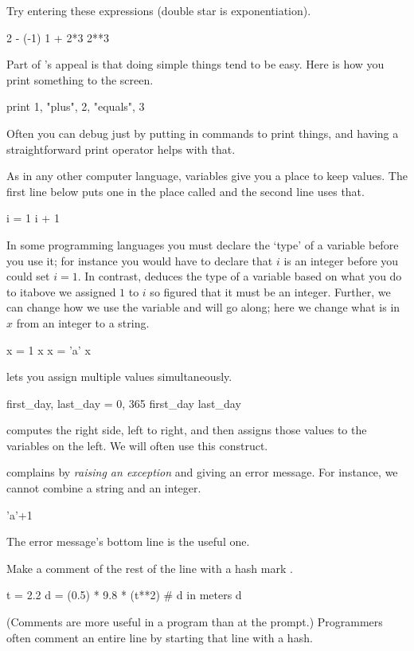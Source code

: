 Try entering these expressions (double star is exponentiation).
\begin{pythonoutput}
2 - (-1)
1 + 2*3
2**3  
\end{pythonoutput}

Part of \python's appeal is that doing simple things tend to be easy.
Here is how you print something to the screen.
\begin{pythonoutput}
print 1, "plus", 2, "equals", 3
\end{pythonoutput}
Often you can debug just by putting in commands to print things, 
and having a straightforward print operator helps with that. 

As in any other computer language, variables give you a place to keep values.
The first line below puts one in the place called 
and the second line uses that.
\begin{pythonoutput}
i = 1
i + 1
\end{pythonoutput}
In some programming languages you must declare the `type' of a variable
before you use it; for instance you would have to declare 
that $i$ is an integer before you could set $i=1$.
In contrast, \python{} deduces the type of a variable 
based on what you do to it\Dash above we assigned $1$ to $i$ 
so \python{} figured that it must be an integer.
Further, we can change how we use the variable and \python{} will 
go along; here we change what is in $x$ from an integer to a string.
\begin{pythonoutput}
x = 1
x
x = 'a'
x
\end{pythonoutput}

\python{} lets you assign multiple values simultaneously.
\begin{pythonoutput}
first_day, last_day = 0, 365
first_day
last_day   
\end{pythonoutput}
\noindent
\python{} computes the right side, left to right, and then assigns 
those values to the variables on the left.
We will often use this construct.

\python{} complains by \textit{raising an exception} and giving an error 
message.
For instance, we cannot combine a string and an integer. 
\begin{pythonoutput}
'a'+1
\end{pythonoutput}
\noindent The error message's bottom line is the useful one.

Make a comment of the rest of the line with a hash mark \inlinecode{\#}.
\begin{pythonoutput}
t = 2.2
d = (0.5) * 9.8 * (t**2)  # d in meters
d
\end{pythonoutput}
\noindent (Comments are more useful in a program than at the prompt.)
Programmers often comment an entire line by starting 
that line with a hash. 

